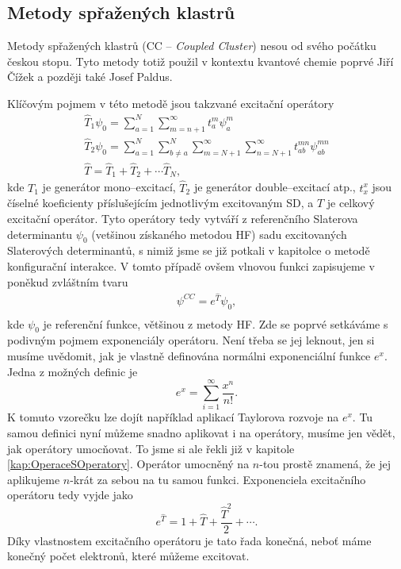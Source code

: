 \subsection{Metody spřažených klastrů}
Metody spřažených klastrů (CC -- \textit{Coupled Cluster}) nesou od svého počátku českou stopu. Tyto metody totiž použil v kontextu kvantové chemie poprvé Jiří Čížek a později také Josef Paldus.

Klíčovým pojmem v této metodě jsou takzvané excitační operátory
\begin{eqnarray}
\hat{T}_1\psi_0=\sum^N_{a=1}\sum_{m=n+1}^\infty t_a^m\psi_a^m \\
\hat{T}_2\psi_0=\sum_{a=1}^N \sum_{b\neq a}^N\sum_{m=N+1}^\infty \sum_{n=N+1}^\infty t_{ab}^{mn}\psi_{ab}^{mn} \\
\hat{T}=\hat{T}_1+\hat{T}_2+\cdots \hat{T}_N ,
\end{eqnarray}
kde $\hat{T_1}$ je generátor mono--excitací, $\hat{T}_2$ je generátor double--excitací atp., $t_x^x$ jsou číselné koeficienty příslušejícím jednotlivým excitovaným SD, a $\hat{T}$ je celkový excitační operátor. Tyto operátory tedy vytváří z referenčního Slaterova determinantu $\psi_0$ (vetšinou získaného metodou HF) sadu excitovaných Slaterových determinantů, s nimiž jsme se již potkali v kapitolce o metodě konfigurační interakce. V tomto případě ovšem vlnovou funkci zapisujeme v poněkud zvláštním tvaru
\begin{eqnarray}
\psi^{CC} = e^{\hat{T}} \psi_0 ,  \\
\end{eqnarray}
kde $\psi_0$ je referenční funkce, většinou z metody HF. Zde se poprvé setkáváme s podivným pojmem exponenciály operátoru. Není třeba se jej leknout, jen si musíme uvědomit, jak je vlastně definována normálni exponenciální funkce $e^x$. Jedna z možných definic je
\begin{equation}
e^x=\sum_{i=1}^\infty \frac{x^n}{n!} .
\end{equation}
K tomuto vzorečku lze dojít například aplikací Taylorova rozvoje na $e^x$.
Tu samou definici nyní můžeme snadno aplikovat i na operátory, musíme jen vědět, jak operátory umocňovat.
To jsme si ale řekli již v kapitole \ref{kap:OperaceSOperatory}. Operátor umocněný na $n$-tou prostě znamená, že jej aplikujeme $n$-krát za sebou na tu samou funkci.
Exponenciela excitačního operátoru tedy vyjde jako 
\begin{equation}
e^{\hat{T}} = 1+\hat{T}+\frac{\hat{T}^2}{2}+\cdots.
\end{equation}
Díky vlastnostem excitačního operátoru je tato řada konečná, neboť máme konečný počet elektronů, které můžeme excitovat.

